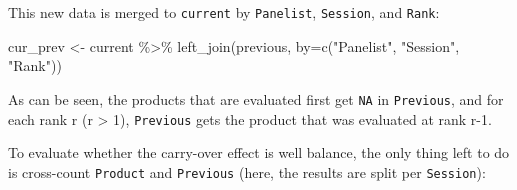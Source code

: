 \documentclass[
]{krantz}
\makeatletter
\newenvironment{Shaded}{\begin{snugshade}}{\end{snugshade}}
\newcommand{\AttributeTok}[1]{\textcolor[rgb]{0.61,0.61,0.61}{#1}}
\newcommand{\DecValTok}[1]{\textcolor[rgb]{0.06,0.06,0.06}{#1}}
\newcommand{\FunctionTok}[1]{\textcolor[rgb]{0,0,0}{#1}}
\newcommand{\NormalTok}[1]{#1}
\newcommand{\OtherTok}[1]{\textcolor[rgb]{0.37,0.37,0.37}{#1}}
\newcommand{\SpecialCharTok}[1]{\textcolor[rgb]{0,0,0}{#1}}
\newcommand{\StringTok}[1]{\textcolor[rgb]{0.5,0.5,0.5}{#1}}
\newenvironment{kframe}{%
\medskip{}
\setlength{\fboxsep}{.8em}
 \def\at@end@of@kframe{}%
 \ifinner\ifhmode%
  \def\at@end@of@kframe{\end{minipage}}%
  \begin{minipage}{\columnwidth}%
 \fi\fi%
 \def\FrameCommand##1{\hskip\@totalleftmargin \hskip-\fboxsep
 \colorbox{shadecolor}{##1}\hskip-\fboxsep
     \hskip-\linewidth \hskip-\@totalleftmargin \hskip\columnwidth}%
 \MakeFramed {\advance\hsize-\width
   \@totalleftmargin\z@ \linewidth\hsize
   \@setminipage}}%
 {\par\unskip\endMakeFramed%
 \at@end@of@kframe}
\renewenvironment{Shaded}{\begin{kframe}}{\end{kframe}}
\makeatother
\begin{document}
\begin{Shaded}
\end{Shaded}

This new data is merged to \texttt{current} by \texttt{Panelist}, \texttt{Session}, and \texttt{Rank}:

\begin{Shaded}
\begin{Highlighting}[]
\NormalTok{cur\_prev }\OtherTok{\textless{}{-}}\NormalTok{ current }\SpecialCharTok{\%\textgreater{}\%} 
  \FunctionTok{left\_join}\NormalTok{(previous, }\AttributeTok{by=}\FunctionTok{c}\NormalTok{(}\StringTok{"Panelist"}\NormalTok{, }\StringTok{"Session"}\NormalTok{, }\StringTok{"Rank"}\NormalTok{))}
\end{Highlighting}
\end{Shaded}

As can be seen, the products that are evaluated first get \texttt{NA} in \texttt{Previous}, and for each rank r (r \textgreater{} 1), \texttt{Previous} gets the product that was evaluated at rank r-1.

To evaluate whether the carry-over effect is well balance, the only thing left to do is cross-count \texttt{Product} and \texttt{Previous} (here, the results are split per \texttt{Session}):
\end{document}
